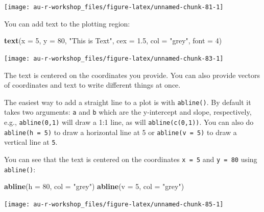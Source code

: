 \documentclass[]{book}
\newenvironment{Shaded}{\begin{snugshade}}{\end{snugshade}}
\newcommand{\KeywordTok}[1]{\textcolor[rgb]{0.13,0.29,0.53}{\textbf{#1}}}
\newcommand{\DataTypeTok}[1]{\textcolor[rgb]{0.13,0.29,0.53}{#1}}
\newcommand{\DecValTok}[1]{\textcolor[rgb]{0.00,0.00,0.81}{#1}}
\newcommand{\FloatTok}[1]{\textcolor[rgb]{0.00,0.00,0.81}{#1}}
\newcommand{\StringTok}[1]{\textcolor[rgb]{0.31,0.60,0.02}{#1}}
\newcommand{\NormalTok}[1]{#1}
\theoremstyle{definition}
\theoremstyle{definition}
\theoremstyle{definition}
\theoremstyle{remark}
\begin{document}
\begin{center}\texttt{[image: au-r-workshop\_files/figure-latex/unnamed-chunk-81-1]} \end{center}

You can add text to the plotting region:

\begin{Shaded}
\begin{Highlighting}[]
\KeywordTok{text}\NormalTok{(}\DataTypeTok{x =} \DecValTok{5}\NormalTok{, }\DataTypeTok{y =} \DecValTok{80}\NormalTok{, }\StringTok{"This is Text"}\NormalTok{, }\DataTypeTok{cex =} \FloatTok{1.5}\NormalTok{, }\DataTypeTok{col =} \StringTok{"grey"}\NormalTok{, }\DataTypeTok{font =} \DecValTok{4}\NormalTok{)}
\end{Highlighting}
\end{Shaded}

\begin{center}\texttt{[image: au-r-workshop\_files/figure-latex/unnamed-chunk-83-1]} \end{center}

The text is centered on the coordinates you provide. You can also
provide vectors of coordinates and text to write different things at
once.

The easiest way to add a straight line to a plot is with
\texttt{abline()}. By default it takes two arguments: \texttt{a} and
\texttt{b} which are the y-intercept and slope, respectively, e.g.,
\texttt{abline(0,1)} will draw a 1:1 line, as will
\texttt{abline(c(0,1))}. You can also do \texttt{abline(h\ =\ 5)} to
draw a horizontal line at 5 or \texttt{abline(v\ =\ 5)} to draw a
vertical line at \texttt{5}.

You can see that the text is centered on the coordinates
\texttt{x\ =\ 5} and \texttt{y\ =\ 80} using \texttt{abline()}:

\begin{Shaded}
\begin{Highlighting}[]
\KeywordTok{abline}\NormalTok{(}\DataTypeTok{h =} \DecValTok{80}\NormalTok{, }\DataTypeTok{col =} \StringTok{"grey"}\NormalTok{)}
\KeywordTok{abline}\NormalTok{(}\DataTypeTok{v =} \DecValTok{5}\NormalTok{, }\DataTypeTok{col =} \StringTok{"grey"}\NormalTok{)}
\end{Highlighting}
\end{Shaded}

\begin{center}\texttt{[image: au-r-workshop\_files/figure-latex/unnamed-chunk-85-1]} \end{center}
\end{document}
